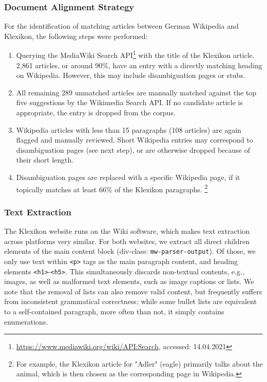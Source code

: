 \documentclass[10pt, a4paper]{article}
\begin{document}
\subsubsection{Document Alignment Strategy}
For the identification of matching articles between German Wikipedia and Klexikon, the following steps were performed:
\begin{enumerate}
	\item Querying the MediaWiki Search API\footnote{\url{https://www.mediawiki.org/wiki/API:Search}, accessed: 14.04.2021} with the title of the Klexikon article.
	2{,}861 articles, or around 90\%, have an entry with a directly matching heading on Wikipedia.
	However, this may include disambiguation pages or stubs.
	\item All remaining 289 unmatched articles are manually matched against the top five suggestions by the Wikimedia Search API.
	If no candidate article is appropriate, the entry is dropped from the corpus.
	\item Wikipedia articles with less than 15 paragraphs (108 articles) are again flagged and manually reviewed. Short Wikipedia entries may correspond to disambiguation pages (see next step), or are otherwise dropped because of their short length.
	\item Disambiguation pages are replaced with a specific Wikipedia page, if it topically matches at least 66\% of the Klexikon paragraphs.
	\footnote{For example, the Klexikon article for "Adler" (eagle) primarily talks about the animal, which is then chosen as the corresponding page in Wikipedia.}
\end{enumerate}


\subsubsection{Text Extraction}
The Klexikon website runs on the Wiki software, which makes text extraction across platforms very similar. For both websites, we extract all direct children elements of the main content block (div-class: \texttt{mw-parser-output}).
Of those, we only use text within \texttt{<p>} tags as the main paragraph content, and heading elements \texttt{<h1>}-\texttt{<h5>}. 
This simultaneously discards non-textual contents, e.g., images, as well as malformed text elements, such as image captions or lists.
We note that the removal of lists can also remove valid content, but frequently suffers from inconsistent grammatical correctness; while some bullet lists are equivalent to a self-contained paragraph, more often than not, it simply contains enumerations.
\end{document}
